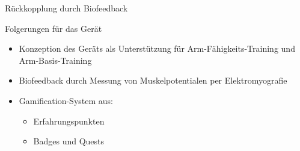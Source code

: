 \documentclass[final,20pt]{beamer}
\newlength{\sepwidth}
\newlength{\colwidth}
\newcommand{\separatorcolumn}{\begin{column}{\sepwidth}\end{column}}
\begin{document}
\begin{frame}[t]
\begin{columns}[t]
\begin{column}{\colwidth}
\begin{alertblock}{Rückkopplung durch Biofeedback}
  \end{alertblock}

  \begin{alertblock}{Folgerungen für das Gerät}
  	\begin{itemize}
  		\item Konzeption des Geräts als Unterstützung für Arm-Fähigkeits-Training und Arm-Basis-Training
  		\item Biofeedback durch Messung von Muskelpotentialen per Elektromyografie
  		\item Gamification-System aus:
  		\begin{itemize}
  			\item Erfahrungspunkten
  			\item Badges und Quests
  		\end{itemize}
  	\end{itemize}
  \end{alertblock}

\end{column}

\separatorcolumn
\end{columns}
\end{frame}
\end{document}
